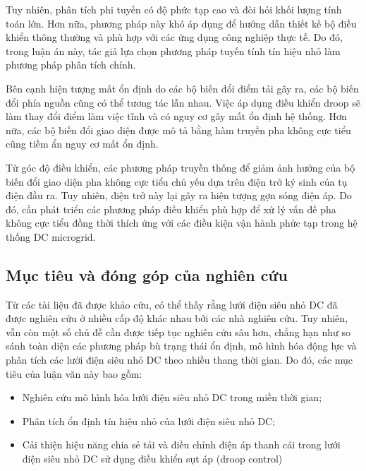 Tuy nhiên, phân tích phi tuyến có độ phức tạp cao và đòi hỏi khối lượng tính toán lớn. Hơn nữa, phương pháp này khó áp dụng để hướng dẫn thiết kế bộ điều khiển thông thường và phù hợp với các ứng dụng công nghiệp thực tế. Do đó, trong luận án này, tác giả lựa chọn phương pháp tuyến tính tín hiệu nhỏ làm phương pháp phân tích chính. \par
Bên cạnh hiện tượng mất ổn định do các bộ biến đổi điểm tải gây ra, các bộ biến đổi phía nguồn cũng có thể tương tác lẫn nhau. Việc áp dụng điều khiển droop sẽ làm thay đổi điểm làm việc tĩnh và có nguy cơ gây mất ổn định hệ thống. Hơn nữa, các bộ biến đổi giao diện được mô tả bằng hàm truyền pha không cực tiểu cũng tiềm ẩn nguy cơ mất ổn định. \par
Từ góc độ điều khiển, các phương pháp truyền thống để giảm ảnh hưởng của bộ biến đổi giao diện pha không cực tiểu chủ yếu dựa trên điện trở ký sinh của tụ điện đầu ra. Tuy nhiên, điện trở này lại gây ra hiện tượng gợn sóng điện áp. Do đó, cần phát triển các phương pháp điều khiển phù hợp để xử lý vấn đề pha không cực tiểu đồng thời thích ứng với các điều kiện vận hành phức tạp trong hệ thống DC microgrid. \par
\subsection{Mục tiêu và đóng góp của nghiên cứu}
Từ các tài liệu đã được khảo cứu, có thể thấy rằng lưới điện siêu nhỏ DC đã được nghiên cứu ở nhiều cấp độ khác nhau bởi các nhà nghiên cứu. Tuy nhiên, vẫn còn một số chủ đề cần được tiếp tục nghiên cứu sâu hơn, chẳng hạn như so sánh toàn diện các phương pháp bù trạng thái ổn định, mô hình hóa động lực và phân tích các lưới điện siêu nhỏ DC theo nhiều thang thời gian. Do đó, các mục tiêu của luận văn này bao gồm: \par
\begin{itemize}
    \item Nghiên cứu mô hình hóa lưới điện siêu nhỏ DC trong miền thời gian;
    \item Phân tích ổn định tín hiệu nhỏ của lưới điện siêu nhỏ DC;
    \item Cải thiện hiệu năng chia sẻ tải và điều chỉnh điện áp thanh cái trong lưới điện siêu nhỏ DC sử dụng điều khiển sụt áp (droop control) 
\end{itemize} 

